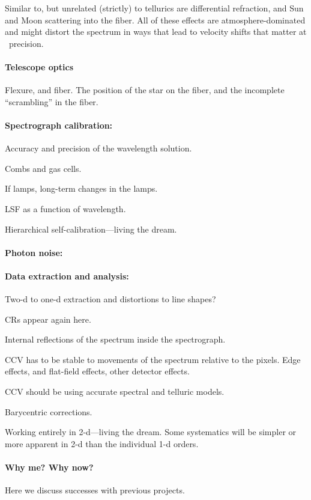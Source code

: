 \documentclass[12pt, fullpage, letterpaper]{article}
\begin{document}
Similar to, but unrelated (strictly) to tellurics are differential
refraction, and Sun and Moon scattering into the fiber.
All of these effects are atmosphere-dominated and might distort the spectrum
in ways that lead to velocity shifts that matter at \EPRV\ precision.

\paragraph{Telescope optics}
Flexure, and fiber. The position of the star on the fiber, and the
incomplete ``scrambling'' in the fiber.

\paragraph{Spectrograph calibration:}
Accuracy and precision of the wavelength solution.

Combs and gas cells.

If lamps, long-term changes in the lamps.

LSF as a function of wavelength.

Hierarchical self-calibration---living the dream.

\paragraph{Photon noise:}

\paragraph{Data extraction and analysis:}
Two-d to one-d extraction and distortions to line shapes?

CRs appear again here.

Internal reflections of the spectrum inside the spectrograph.

CCV has to be stable to movements of the spectrum relative to the
pixels. Edge effects, and flat-field effects, other detector effects.

CCV should be using accurate spectral and telluric models.

Barycentric corrections.

Working entirely in 2-d---living the dream. Some systematics will be
simpler or more apparent in 2-d than the individual 1-d orders.

\paragraph{Why me? Why now?}
Here we discuss successes with previous projects.
\end{document}
